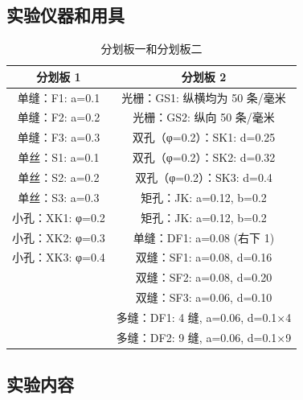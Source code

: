 \documentclass[zihao=5, UTF8]{article}
\theoremstyle{MyLineTheoremStyle} %
\theoremstyle{MyBlockTheoremStyle} %
\theoremstyle{MySubsubsectionStyle} %
\begin{document}
\subsection{实验仪器和用具}

\begin{table}[h]
\centering
\begin{tabular}{|c|c|}
\hline
\textbf{分划板 1} & \textbf{分划板 2} \\
\hline
单缝：F1: a=0.1 & 光栅：GS1: 纵横均为 50 条/毫米 \\
单缝：F2: a=0.2 & 光栅：GS2: 纵向 50 条/毫米 \\
单缝：F3: a=0.3 & 双孔（φ=0.2）：SK1: d=0.25 \\
单丝：S1: a=0.1 & 双孔（φ=0.2）：SK2: d=0.32 \\
单丝：S2: a=0.2 & 双孔（φ=0.2）：SK3: d=0.4 \\
单丝：S3: a=0.3 & 矩孔：JK: a=0.12, b=0.2 \\
小孔：XK1: φ=0.2 & 矩孔：JK: a=0.12, b=0.2 \\
小孔：XK2: φ=0.3 & 单缝：DF1: a=0.08 (右下 1) \\
小孔：XK3: φ=0.4 & 双缝：SF1: a=0.08, d=0.16 \\
& 双缝：SF2: a=0.08, d=0.20 \\
& 双缝：SF3: a=0.06, d=0.10 \\
& 多缝：DF1: 4 缝, a=0.06, d=0.1×4 \\
& 多缝：DF2: 9 缝, a=0.06, d=0.1×9 \\
\hline
\end{tabular}
\caption{分划板一和分划板二}
\label{tab:dividers}
\end{table}

\subsection{实验内容}
\end{document}
